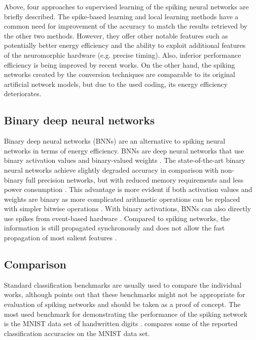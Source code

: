 Above, four approaches to supervised learning of the spiking neural networks are briefly described. The spike-based learning and local learning methods have a common need for improvement of the accuracy to match the results retrieved by the other two methods. However, they offer other notable features such as potentially better energy efficiency and the ability to exploit additional features of the neuromorphic hardware (e.g. precise timing). Also, inferior performance efficiency is being improved by recent works. On the other hand, the spiking networks created by the conversion techniques are comparable to its original artificial network models, but due to the used coding, its energy efficiency deteriorates.

\subsection{Binary deep neural networks}
Binary deep neural networks (BNNs) are an alternative to spiking neural networks in terms of energy efficiency. BNNs are deep neural networks that use binary activation values and binary-valued weights \cite{simonsReviewBinarized19}. The state-of-the-art binary neural networks achieve slightly degraded accuracy in comparison with non-binary full precision networks, but with reduced memory requirements and less power consumption \cite{courbariauxBinarizedNeural16}. This advantage is more evident if both activation values and weights are binary as more complicated arithmetic operations can be replaced with simpler bitwise operations \cite{kimBitwiseNeural16}. With binary activations, BNNs can also directly use spikes from event-based hardware \cite{linAccurateBinary17}. Compared to spiking networks, the information is still propagated synchronously and does not allow the fast propagation of most salient features \cite{pfeifferDeepLearningSpiking2018}.

\subsection{Comparison}
Standard classification benchmarks are usually used to compare the individual works, although \cite{pfeifferDeepLearningSpiking2018} points out that these benchmarks might not be appropriate for evaluation of spiking networks and should be taken as a proof of concept. The most used benchmark for demonstrating the performance of the spiking network is the MNIST data set of handwritten digits \cite{lecunGradientbasedLearning98}.  compares some of the reported classification accuracies on the MNIST data set.

